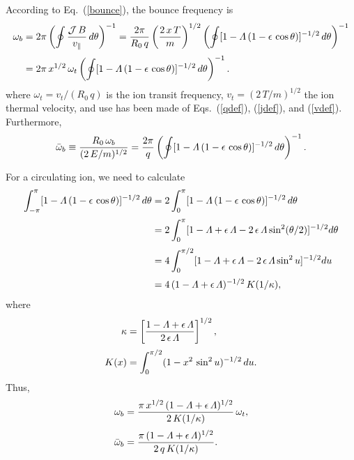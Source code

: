 \documentclass[12pt,prb,aps,notitlepage]{revtex4-1}
\begin{document}
According to Eq.~(\ref{bounce}), the bounce frequency is 
\begin{align}
\omega_b &=2\pi\left(\oint\frac{{\cal J}\,B}{v_\parallel}\,d\theta\right)^{-1}=\frac{2\pi}{R_0\,q}\left(\frac{2\,x\,T}{m}\right)^{1/2}
\left(\oint [1-{\mit\Lambda}\,(1-\epsilon\,\cos\theta)]^{-1/2}\,d\theta\right)^{-1}\nonumber\\[0.5ex]
&=2\pi\,x^{1/2}\,\omega_t\left(\oint [1-{\mit\Lambda}\,(1-\epsilon\,\cos\theta)]^{-1/2}\,d\theta\right)^{-1}.
\end{align}
where  $\omega_t=v_t/(R_0\,q)$ is the ion transit frequency, $v_t=(2\,T/m)^{1/2}$ the ion thermal velocity, and use has been made of Eqs.~(\ref{qdef}), (\ref{jdef}), and (\ref{vdef}). Furthermore,
\begin{equation}
\bar{\omega}_b \equiv \frac{R_0\,\omega_b}{(2\,E/m)^{1/2}}=\frac{2\pi}{q}\left(\oint [1-{\mit\Lambda}\,(1-\epsilon\,\cos\theta)]^{-1/2}\,d\theta\right)^{-1}.
\end{equation}

For a  circulating ion, we need to calculate 
\begin{align}
\int_{-\pi}^{\pi} [1-{\mit\Lambda}\,(1-\epsilon\,\cos\theta)]^{-1/2}\,d\theta &= 2\int_0^\pi [1-{\mit\Lambda}\,(1-\epsilon\,\cos\theta)]^{-1/2}\,d\theta
\nonumber\\[0.5ex]
&= 2\int_0^\pi [1-{\mit\Lambda}+\epsilon\,{\mit\Lambda} - 2\,\epsilon\,{\mit\Lambda}\sin^2(\theta/2)]^{-1/2}d\theta\nonumber\\[0.5ex]
&= 4\int_0^{\pi/2} [1-{\mit\Lambda}+\epsilon\,{\mit\Lambda} - 2\,\epsilon\,{\mit\Lambda}\sin^2 u]^{-1/2}du\nonumber\\[0.5ex]
&= 4\,(1-{\mit\Lambda}+\epsilon\,{\mit\Lambda})^{-1/2}\,K(1/\kappa),
\end{align}
where
\begin{align}
\kappa & =\left[\frac{1-{\mit\Lambda}+\epsilon\,{\mit\Lambda}}{2\,\epsilon\,{\mit\Lambda}}\right]^{1/2},\\[0.5ex]
K(x) &=\int_0^{\pi/2}(1-x^2\,\sin^2 u)^{-1/2}\,du.\end{align}
Thus,
\begin{align}
\omega_b &= \frac{\pi\,x^{1/2}\,(1-{\mit\Lambda}+\epsilon\,{\mit\Lambda})^{1/2}}{2\,K(1/\kappa)}\,\omega_t,\\[0.5ex]
\bar{\omega}_b &=\frac{\pi\,(1-{\mit\Lambda}+\epsilon\,{\mit\Lambda})^{1/2}}{2\,q\,K(1/\kappa)}.
\end{align}
\end{document}
